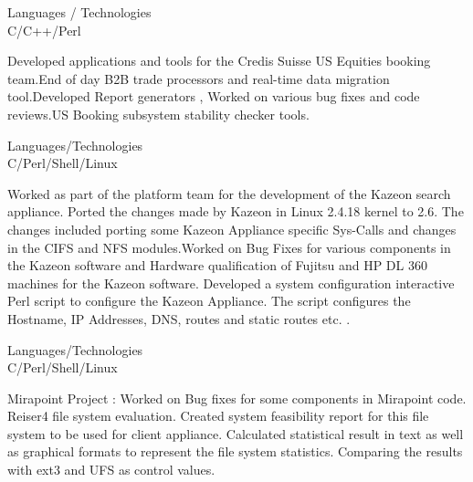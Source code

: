 \documentclass[a4,11pt]{cv4tw}
\begin{document}
{Languages / Technologies \\ C/C++/Perl}
	{ 
	\begin{missions}
		\item Developed applications and tools for the Credis Suisse US Equities booking team.End of day B2B trade processors and real-time data migration tool.Developed Report generators , Worked on various bug fixes and code reviews.US Booking subsystem stability checker tools.
	\end{missions}
}

{Languages/Technologies \\ C/Perl/Shell/Linux}
	{ 
	\begin{missions}		
		\item Worked as part of the platform team for the development of the Kazeon search appliance. Ported the changes made by Kazeon in Linux 2.4.18 kernel to 2.6. The changes included porting some Kazeon Appliance specific Sys-Calls and changes in the CIFS and NFS modules.Worked on Bug Fixes for various components in the Kazeon software and  Hardware qualification of Fujitsu and HP DL 360 machines for the Kazeon software. Developed a  system configuration interactive Perl script to configure the Kazeon Appliance. The script configures the Hostname, IP Addresses, DNS, routes and static routes etc. .
	\end{missions}
}

{Languages/Technologies \\ C/Perl/Shell/Linux}
	{ 
	\begin{missions}		
		\item Mirapoint Project : Worked on Bug fixes for some components in Mirapoint code. Reiser4 file system evaluation. Created system feasibility report for this file system to be used for client appliance. Calculated statistical result in text as well as graphical formats to represent the file system statistics. Comparing the results with ext3 and UFS as control values.
	\end{missions}
}
\end{document}
